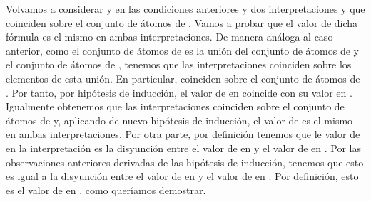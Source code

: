 \begin{isabellebody}
\begin{isamarkuptext}
\begin{demostracion}
    Volvamos a considerar  y  en las condiciones anteriores y
    dos interpretaciones  y  que coinciden sobre el
    conjunto de átomos de . Vamos a probar que el valor de 
    dicha fórmula es el mismo en ambas interpretaciones.
    De manera análoga al caso anterior, como el conjunto de átomos de
     es la unión del conjunto de átomos de  y el conjunto de
    átomos de , tenemos que las interpretaciones coinciden sobre los
    elementos de esta unión. En particular, coinciden sobre el conjunto
    de átomos de . Por tanto, por hipótesis de inducción, el valor
    de  en  coincide con su valor en . Igualmente 
    obtenemos que las interpretaciones coinciden sobre el conjunto de
    átomos de  y, aplicando de nuevo hipótesis de inducción, el 
    valor de  es el mismo en ambas interpretaciones. 
    Por otra parte, por definición tenemos que le valor de  en
    la interpretación  es la disyunción entre el valor de  en
     y el valor de  en . Por las observaciones
    anteriores derivadas de las hipótesis de inducción, tenemos que
    esto es igual a la disyunción entre el valor de  en  y
    el valor de  en . Por definición, esto es el valor de 
     en , como queríamos demostrar.


\end{demostracion}
\end{isamarkuptext}
\end{isabellebody}
